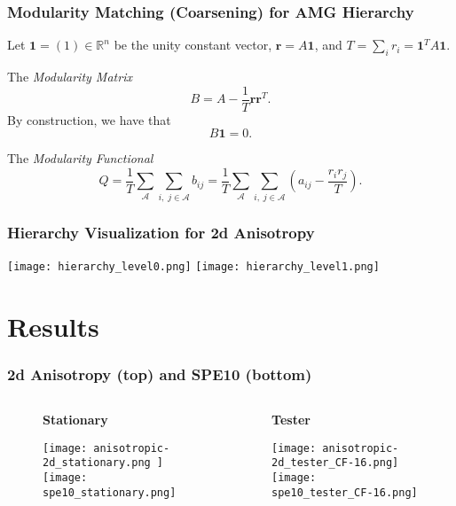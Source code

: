 \documentclass[xcolor=dvipsnames]{beamer}
\def\A{{\mathcal A}}
\def\bone{{\mathbf 1}}
\def\br{{\mathbf r}}
\begin{document}
\begin{frame}
  \frametitle{Modularity Matching (Coarsening) for AMG Hierarchy}
Let $\bone = (1) \in {\mathbb R}^n$ be the unity constant vector,
$\br = A \bone$, and $T = \sum\limits_i r_i = \bone^T A \bone$.

  \vspace{1em}

The {\em Modularity Matrix} \cite{Newman}
\begin{equation*}
    B = A - \frac{1}{T}\br \br^T.
\end{equation*}
By construction, we have that
\begin{equation}\label{zero row sums of B}
B\bone =0.
\end{equation}

  The {\em Modularity Functional} \cite{Quiring2019}
\begin{equation*}
    Q = \frac{1}{T}\sum\limits_\A \sum\limits_{i,\;j \in \A} b_{ij}
    = \frac{1}{T}\sum\limits_\A \sum\limits_{i,\;j \in \A} \left(a_{ij} - \frac{r_ir_j}{T}\right).
\end{equation*}
\end{frame}

\begin{frame}
  \frametitle{Hierarchy Visualization for 2d Anisotropy}
  \texttt{[image: hierarchy\_level0.png]}
  \texttt{[image: hierarchy\_level1.png]}
\end{frame}

\section{Results}

\begin{frame}
  \frametitle{2d Anisotropy (top) and SPE10 (bottom)}
  \begin{columns}
    \begin{column}{0.49\textwidth}
    \begin{figure}
    \centering
    \textbf{Stationary}
    
    \texttt{[image: anisotropic-2d\_stationary.png ]}
    \texttt{[image: spe10\_stationary.png]}
    \end{figure}
    \end{column}

    \begin{column}{0.49\textwidth}
    \begin{figure}
    \centering
    \textbf{Tester}
    
    \texttt{[image: anisotropic-2d\_tester\_CF-16.png]}
    \texttt{[image: spe10\_tester\_CF-16.png]}
    \end{figure}
    \end{column}
  \end{columns}
\end{frame}
\end{document}
